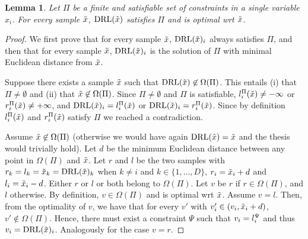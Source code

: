 
\newtheorem*{lem}{Lemma}

\begin{lem}%
    Let $\Pi$ be a finite and satisfiable set of constraints in a single variable $x_i$. For every sample $\tilde{x}$, $\text{DRL}(\tilde{x})$ satisfies $\Pi$ and is optimal wrt $\tilde{x}$.
\end{lem}

\begin{proof}\rm
    We first prove that for every sample $\tilde{x}$, $\text{DRL}(\tilde{x})_i$ always satisfies $\Pi$, and then that for every sample $\tilde{x}$, $\text{DRL}(\tilde{x})_i$ is the solution of $\Pi$ with minimal Euclidean distance from $\tilde{x}$.
    
    Suppose there exists a sample $\tilde{x}$ such that $\text{DRL}(\tilde{x}) \not \in \Omega(\Pi)$. This entails (i) that $\Pi \not = \emptyset$ and (ii) that $\tilde{x} \not\in \Omega(\Pi)$. Since $\Pi \not = \emptyset$ and $\Pi$ is satisfiable, $l_i^{\Pi}(\tilde{x}) \neq -\infty$ or $r_i^{\Pi}(\tilde{x}) \neq + \infty$, and $\text{DRL}(\tilde{x})_i = l_i^{\Pi}(\tilde{x})$ or $\text{DRL}(\tilde{x})_i = r_i^{\Pi}(\tilde{x})$. Since by definition  $l_i^{\Pi}(\tilde{x})$ and $r_i^{\Pi}(\tilde{x})$ satisfy $\Pi$ we reached a contradiction.

    Assume  
     $\tilde{x} \not \in \Omega(\Pi)$ (otherwise we would have again  $\text{DRL}(\tilde{x}) = \tilde{x}$ and the thesis would trivially hold). 
    Let $d$ be the minimum Euclidean distance between any point in $\Omega(\Pi)$ and $\tilde{x}$. Let $r$ and $l$ be the two samples with $r_k = l_k = \tilde{x}_k = \text{DRL}(\tilde{x})_k$ when $k \not = i$ and $k \in \{1, \dots, D\}$, 
    $r_i = \tilde{x}_i + d$ and $l_i = \tilde{x}_i - d$. Either $r$ or $l$ or both belong to $\Omega(\Pi)$. Let $v$ be $r$ if $r \in \Omega(\Pi)$, and $l$ otherwise.
    By definition, $v \in \Omega(\Pi)$ and is optimal wrt $\tilde{x}$.
    Assume $v = l$.
     Then, from the optimality of $v$, we have that for every $v'$ with
    $v'_i \in (v_i, \tilde{x}_i + d)$, $v' \not \in \Omega(\Pi)$. Hence, there must exist a constraint $\Psi$ such that $v_i = l_i^\Psi$ and thus $v_i = \text{DRL}(\tilde{x})_i$.
    Analogously for the case $v = r$.


    
    


\end{proof}